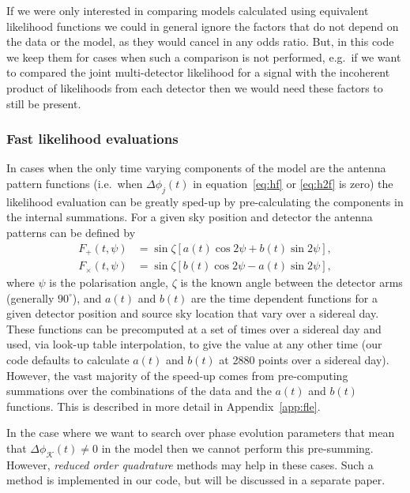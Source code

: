 If we were only interested in comparing models calculated using equivalent likelihood functions we could in
general ignore the factors that do not depend on the data or the model, as they would cancel in any odds
ratio. But, in this code we keep them for cases when such a comparison is not performed, e.g.\ if we
want to compared the joint multi-detector likelihood for a signal with the incoherent product of likelihoods
from each detector then we would need these factors to still be present.

\subsubsection{Fast likelihood evaluations}\label{sec:fastlike}

In cases when the only time varying components of the model are the antenna pattern functions (i.e.\ when 
$\Delta \phi_j(t)$ in equation~\ref{eq:hf} or \ref{eq:h2f} is zero) the likelihood
evaluation can be greatly sped-up by pre-calculating the components in the internal summations. For a given sky
position and detector the antenna patterns can be defined by \citep{1998PhRvD..58f3001J}
\begin{align}\label{eq:antenna}
F_+(t,\psi) &= \sin{\zeta}\left[a(t)\cos{2\psi} + b(t)\sin{2\psi}\right], \nonumber \\
F_{\times}(t,\psi) &= \sin{\zeta}\left[b(t)\cos{2\psi} - a(t)\sin{2\psi}\right],
\end{align}
where $\psi$ is the \gw polarisation angle, $\zeta$ is the known angle between the detector arms (generally
$90^{\circ}$), and $a(t)$ and $b(t)$ are the time dependent functions for a given detector position and
source sky location that vary over a sidereal day. These functions can be precomputed at a set of times over
a sidereal day and used, via look-up table interpolation, to give the value at any other time (our code
defaults to calculate $a(t)$ and $b(t)$ at 2880 points over a sidereal day). However, the vast majority of the
speed-up comes from pre-computing summations over the combinations of the data and the $a(t)$ and $b(t)$ functions.
This is described in more detail in Appendix~\ref{app:fle}.

In the case where we want to search over phase evolution parameters that mean that $\Delta\phi_{\mathcal{K}}(t) \ne 0$ in the model then
we cannot perform this pre-summing. However, {\it reduced order quadrature} methods
\citep[e.g.][]{2014PhRvX...4c1006F, 2015PhRvL.114g1104C} may help in these cases. Such a method is implemented in our
code, but will be discussed in a separate paper.

